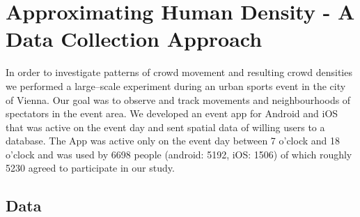 \documentclass[12pt,a4paper,twoside,openright]{book}
\begin{document}
\section{Approximating Human Density - A Data Collection Approach}
\label{sec:an-approach}

In order to investigate patterns of crowd movement and resulting crowd densities we performed a large--scale experiment during an urban sports event in the city of Vienna.
%
Our goal was to observe and track movements and neighbourhoods of spectators in the event area.
%
We developed an event app for Android and iOS that was active on the event day and sent spatial data of willing users to a database.
%
The App was active only on the event day between 7 o'clock and 18 o'clock and was used by 6698 people (android: 5192, iOS: 1506) of which roughly 5230 agreed to participate in our study.

\subsection{Data}
\label{subsec:data}
\end{document}
